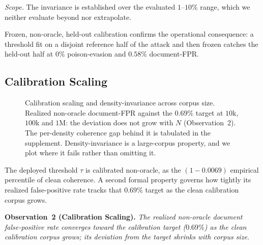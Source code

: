 \documentclass[10pt,journal,compsoc]{IEEEtran}
\begin{document}
\emph{Scope.} The invariance is established over the evaluated $1$--$10\%$ range,
which we neither evaluate beyond nor extrapolate.

Frozen, non-oracle, held-out calibration confirms the operational consequence: a
threshold fit on a disjoint reference half of the attack and then frozen catches the
held-out half at $0\%$ poison-evasion and $0.58\%$ document-FPR.

\subsection{Calibration Scaling}
\label{subsec:calib}

\begin{figure}[t]
\centering
{}
\caption{Calibration scaling and density-invariance across corpus size. Realized non-oracle document-FPR against the $0.69\%$ target at $10$k, $100$k and $1$M: the deviation does not grow with $N$ (Observation~2). The per-density coherence gap behind it is tabulated in the supplement. Density-invariance is a large-corpus property, and we plot where it fails rather than omitting it.}
\label{fig:scaling}
\end{figure}
The deployed threshold $\tau$ is calibrated non-oracle, as the $(1-0.0069)$
empirical percentile of clean coherence. A second formal property governs how
tightly its realized false-positive rate tracks that $0.69\%$ target as the clean
calibration corpus grows.

\smallskip
\noindent\textbf{Observation~2 (Calibration Scaling).}
\emph{The realized non-oracle document false-positive rate converges toward the
calibration target ($0.69\%$) as the clean calibration corpus grows; its deviation
from the target shrinks with corpus size.}
\end{document}
